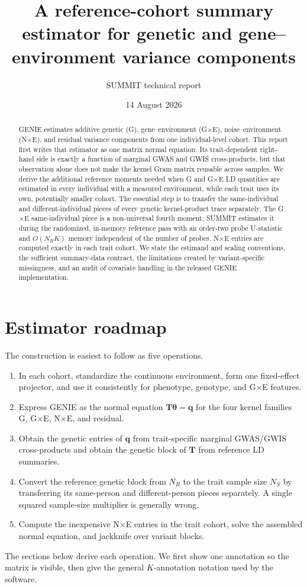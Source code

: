 \documentclass[11pt]{article}
\title{A reference-cohort summary estimator for genetic and gene--environment variance components}
\author{SUMMIT technical report}
\date{14 August 2026}
\begin{document}
\maketitle

\begin{abstract}
GENIE estimates additive genetic (G), gene--environment (G$\times$E),
noise--environment (N$\times$E), and residual variance components from one
individual-level cohort.  This report first writes that estimator as one
matrix normal equation.  Its trait-dependent right-hand side is exactly a
function of marginal GWAS and GWIS cross-products, but that observation alone
does not make the kernel Gram matrix reusable across samples.  We derive the
additional reference moments needed when G and G$\times$E LD quantities are
estimated in every individual with a measured environment, while each trait
uses its own, potentially smaller cohort.  The essential step is to transfer
the same-individual and different-individual pieces of every genetic
kernel-product trace separately.  The G$\times$E same-individual piece is a
non-universal fourth moment; SUMMIT estimates it during the randomized,
in-memory reference pass with an order-two probe U-statistic and $O(N_RK)$
memory independent of the number of probes.  N$\times$E entries are computed
exactly in each trait cohort.  We state the estimand and scaling conventions,
the sufficient summary-data contract, the limitations created by
variant-specific missingness, and an audit of covariate handling in the
released GENIE implementation.
\end{abstract}

\section{Estimator roadmap}

The construction is easiest to follow as five operations.
\begin{enumerate}
 \item In each cohort, standardize the continuous environment, form one
 fixed-effect projector, and use it consistently for phenotype, genotype,
 and G$\times$E features.
 \item Express GENIE as the normal equation $\bm T\bm\theta=\bm q$ for the
 four kernel families G, G$\times$E, N$\times$E, and residual.
 \item Obtain the genetic entries of $\bm q$ from trait-specific marginal
 GWAS/GWIS cross-products and obtain the genetic block of $\bm T$ from
 reference LD summaries.
 \item Convert the reference genetic block from $N_R$ to the trait sample
 size $N_S$ by transferring its same-person and different-person pieces
 separately.  A single squared sample-size multiplier is generally wrong.
 \item Compute the inexpensive N$\times$E entries in the trait cohort, solve
 the assembled normal equation, and jackknife over variant blocks.
\end{enumerate}
The sections below derive each operation.  We first show one annotation so
the matrix is visible, then give the general $K$-annotation notation used by
the software.
\end{document}
